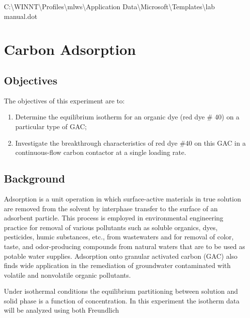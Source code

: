 \documentclass{article} %
\begin{document}


\noindent C:{\textbackslash}WINNT{\textbackslash}Profiles{\textbackslash}mlws{\textbackslash}Application Data{\textbackslash}Microsoft{\textbackslash}Templates{\textbackslash}lab manual.dot

\noindent 

\noindent 

\noindent 

\noindent 
\section{Carbon Adsorption}

\noindent 
\subsection{Objectives}

The objectives of this experiment are to:

\begin{enumerate}
\item  Determine the equilibrium isotherm for an organic dye (red dye \# 40) on a particular type of GAC; 

\item  Investigate the breakthrough characteristics of red dye \#40 on this GAC in a continuous-flow carbon contactor at a single loading rate. 
\end{enumerate}

\noindent 
\subsection{Background}

Adsorption is a unit operation in which surface-active materials in true solution are removed from the solvent by interphase transfer to the surface of an adsorbent particle. This process is employed in environmental engineering practice for removal of various pollutants such as soluble organics, dyes, pesticides, humic substances, etc., from wastewaters and for removal of color, taste, and odor-producing compounds from natural waters that are to be used as potable water supplies. Adsorption onto granular activated carbon (GAC) also finds wide application in the remediation of groundwater contaminated with volatile and nonvolatile organic pollutants.

Under isothermal conditions the equilibrium partitioning between solution and solid phase is a function of concentration. In this experiment the isotherm data will be analyzed using both Freundlich 
\end{document}
